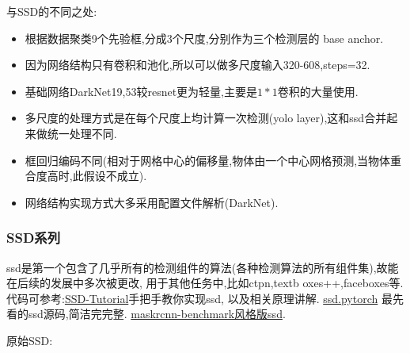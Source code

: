\documentclass[UTF8]{ctexart}
\begin{document}
与SSD的不同之处:
\begin{itemize}
	\item 根据数据聚类9个先验框,分成3个尺度,分别作为三个检测层的 base anchor.
	\item 因为网络结构只有卷积和池化,所以可以做多尺度输入320-608,steps=32.
	\item 基础网络DarkNet19,53较resnet更为轻量,主要是$1*1$卷积的大量使用.
	\item 多尺度的处理方式是在每个尺度上均计算一次检测(yolo layer),这和ssd合并起来做统一处理不同.
	\item 框回归编码不同(相对于网格中心的偏移量,物体由一个中心网格预测,当物体重合度高时,此假设不成立).
	\item 网络结构实现方式大多采用配置文件解析(DarkNet).
\end{itemize}

\subsubsection{SSD系列}
ssd是第一个包含了几乎所有的检测组件的算法(各种检测算法的所有组件集),故能在后续的发展中多次被更改,
用于其他任务中,比如ctpn,textb
oxes++,faceboxes等.代码可参考:\href{https://github.com/sgrvinod/a-PyTorch-Tutorial-to-Object-Detection}{SSD-Tutorial}手把手教你实现ssd,
以及相关原理讲解. \href{https://github.com/amdegroot/ssd.pytorch}{ssd.pytorch} 
最先看的ssd源码,简洁完完整.
\href{https://github.com/lufficc/SSD}{maskrcnn-benchmark风格版ssd}.

原始SSD:
\end{document}
